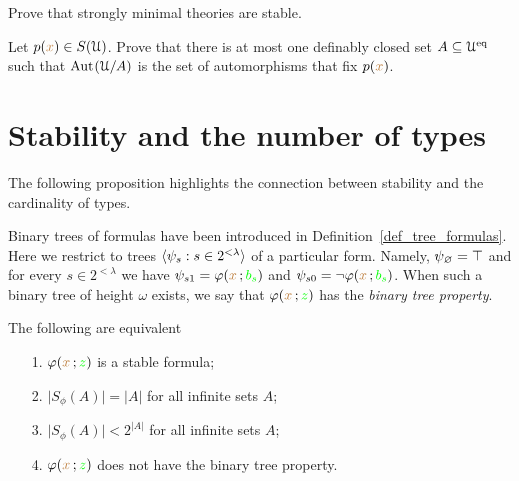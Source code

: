 \documentclass[creche.tex]{subfiles}
\begin{document}
\begin{exercise}
Prove that strongly minimal theories are stable.\QED
\end{exercise}


\begin{exercise}\label{ex_Cb}
Let $p({\color{brown} x})\in S(\EuScript U)$. Prove that there is at most one definably closed set $A\subseteq\EuScript U^{{\rm eq}}$ such that $\textrm{Aut\kern.15ex}(\EuScript U/A)$ is the set of automorphisms that fix $p({\color{brown} x})$.\QED
\end{exercise}

\section{Stability and the number of types}

The following proposition highlights the connection between stability and the cardinality of types. 

Binary trees of formulas have been introduced in Definition~\ref{def_tree_formulas}. Here we restrict to trees $\langle\psi_s:s\in 2^{<\lambda}\rangle$ of a particular form. Namely, $\psi_\varnothing=\top$ and for every $s\in 2^{<\lambda}$ we have $\psi_{s1}=\varphi({\color{brown} x}\,;{\color{green} b_s})$ and $\psi_{s0}=\neg\varphi({\color{brown} x}\,;{\color{green} b_s})$. When such a binary tree of height $\omega$ exists, we say that $\varphi({\color{brown} x}\,;{\color{green} z})$ has the \emph{binary tree property}.

\begin{proposition}\label{prop_count_types}
The following are equivalent
\begin{itemize}
\item[1.] $\varphi({\color{brown} x}\,;{\color{green} z})$ is a stable formula;
\item[2.] $\big|S_{\phi}(A)\big|=|A|$ for all infinite sets $A$;
\item[3.] $\big|S_{\phi}(A)\big|<2^{|A|}$ for all infinite sets $A$;
\item[4.] $\varphi({\color{brown} x}\,;{\color{green} z})$ does not have the binary tree property.
\end{itemize}
\end{proposition}

\def\ceq#1#2#3{\parbox[t]{15ex}{$\displaystyle #1$}\medrel{#2}$\displaystyle  #3$}
\end{document}
